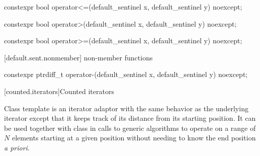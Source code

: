 \begin{addedblock}
%
%
\begin{itemdecl}
constexpr bool operator<=(default_sentinel x, default_sentinel y) noexcept;
\end{itemdecl}

\begin{itemdescr}
\pnum
\returns {}
\end{itemdescr}

%
%
\begin{itemdecl}
constexpr bool operator>(default_sentinel x, default_sentinel y) noexcept;
\end{itemdecl}

\begin{itemdescr}
\pnum
\returns {}
\end{itemdescr}

%
%
\begin{itemdecl}
constexpr bool operator>=(default_sentinel x, default_sentinel y) noexcept;
\end{itemdecl}

\begin{itemdescr}
\pnum
\returns {}
\end{itemdescr}

[default.sent.nonmember]{ non-member functions}

%
%
\begin{itemdecl}
constexpr ptrdiff_t operator-(default_sentinel x, default_sentinel y) noexcept;
\end{itemdecl}

\begin{itemdescr}
\pnum
\returns {}
\end{itemdescr}

[counted.iterators]{Counted iterators}

\pnum
Class template  is an iterator adaptor
with the same behavior as the underlying iterator except that it
keeps track of its distance from its starting position. It can be
used together with class  in calls to generic
algorithms to operate on a range of $N$ elements starting at a given
position without needing to know the end position \textit{a priori}.


\end{addedblock}
